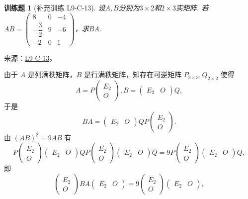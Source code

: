 \documentclass[UTF8,12pt,a4paper,fontset=fandol]{ctexart}
\newtheorem{exercise}{训练题}[section]
\begin{document}
\begin{exercise}[补充训练 L9-C-13]\label{prob:L9-C-13}
设$A,B$分别为$3 \times 2$和$2 \times 3$实矩阵. 若$AB=\begin{pmatrix}
                8             & 0 & -4 \\[1ex]
                -\dfrac{3}{2} & 9 & -6 \\[1ex]
                -2            & 0 & 1
            \end{pmatrix}$，求$BA$.
\end{exercise}
\noindent 来源：\href{https://github.com/yhwu-is/Linear-Algebra-Left-Undone/blob/new/%E8%AE%B2%E4%B9%89/%E4%B8%93%E9%A2%98/9%20%E7%9F%A9%E9%98%B5%E8%BF%90%E7%AE%97%E8%BF%9B%E9%98%B6.tex}{L9-C-13}。
\begin{solve}
由于 $A$ 是列满秩矩阵，$B$ 是行满秩矩阵，知存在可逆矩阵 $P_{3\times 3},Q_{2\times 2}$ 使得
            \[A=P\begin{pmatrix}E_2 \\ O\end{pmatrix},B=\begin{pmatrix}E_2 & O\end{pmatrix}Q,\]
            于是
            \[BA=\begin{pmatrix}E_2 & O\end{pmatrix}QP\begin{pmatrix}E_2 \\ O\end{pmatrix}.\]
            由 $(AB)^2=9AB$ 有 \[P\begin{pmatrix}E_2 \\ O\end{pmatrix}\begin{pmatrix}E_2 & O\end{pmatrix}QP\begin{pmatrix}E_2 \\ O\end{pmatrix}\begin{pmatrix}E_2 & O\end{pmatrix}Q=9P\begin{pmatrix}E_2 \\ O\end{pmatrix}\begin{pmatrix}E_2 & O\end{pmatrix}Q,\]
            即
            \[\begin{pmatrix}E_2 \\ O\end{pmatrix}BA\begin{pmatrix}E_2 & O\end{pmatrix}=9\begin{pmatrix}E_2 \\ O\end{pmatrix}\begin{pmatrix}E_2 & O\end{pmatrix},\]

\end{solve}
\end{document}
